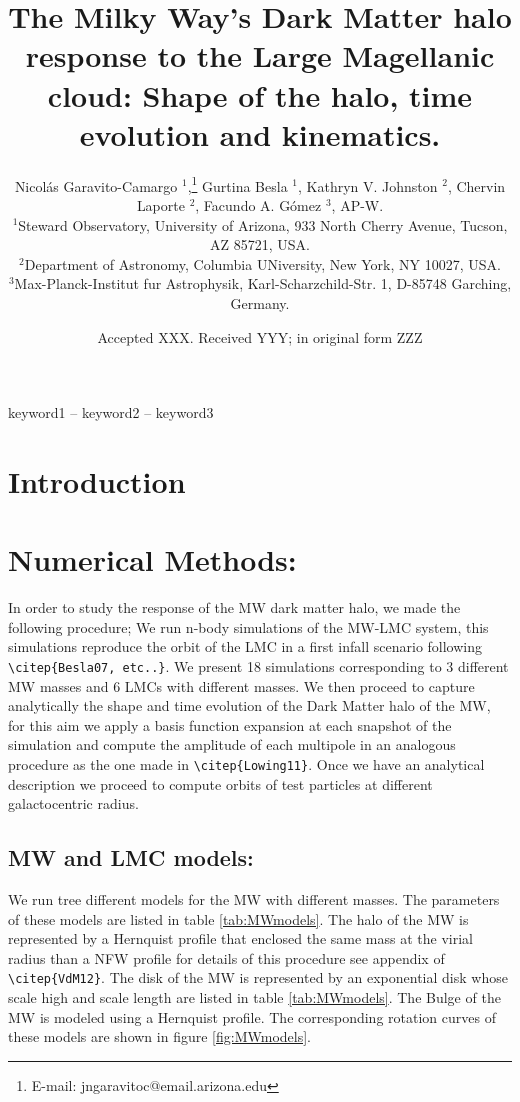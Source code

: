 \documentclass[a4paper,fleqn,usenatbib]{mnras}
\title[The Milky Way Dark Matter halo response to the Large Magellanic
Cloud]{The Milky Way's Dark Matter halo response to the Large Magellanic
cloud: Shape of the halo, time evolution and kinematics.}
\author[N. Garavito-Camargo et al.]{
Nicol\'as Garavito-Camargo $^{1}$,\thanks{E-mail:
jngaravitoc@email.arizona.edu}
Gurtina Besla $^{1}$,
Kathryn V. Johnston $^{2}$,
Chervin Laporte $^{2}$,
Facundo A. G\'omez $^{3}$,
AP-W.
\\
$^{1}$Steward Observatory, University of Arizona, 933 North Cherry
Avenue, Tucson, AZ 85721, USA.\\
$^{2}$Department of Astronomy, Columbia UNiversity, New York, NY
10027, USA.\\
$^{3}$Max-Planck-Institut fur Astrophysik, Karl-Scharzchild-Str. 1,
D-85748 Garching, Germany.
}
\date{Accepted XXX. Received YYY; in original form ZZZ}
\begin{document}
\label{firstpage}
\pagerange{\pageref{firstpage}--\pageref{lastpage}}
\maketitle

\begin{abstract}
\end{abstract}

\begin{keywords}
keyword1 -- keyword2 -- keyword3
\end{keywords}



\section{Introduction}




\cite{Hernquist92}

\section{Numerical Methods:}

In order to study the response of the MW dark matter halo, we made the
following procedure; We run n-body simulations of the MW-LMC
system, this simulations reproduce the orbit of the LMC in a first
infall scenario following \verb+\citep{Besla07, etc..}+. We present 18
simulations corresponding to 3 different MW masses and 6 LMCs with
different masses. We then proceed to capture analytically the shape
and time evolution of the Dark Matter halo of the MW, for this aim we 
apply a basis function expansion at each snapshot of the simulation
and compute the amplitude of each multipole in an analogous
procedure as the one made in \verb+\citep{Lowing11}+. Once we have an
analytical description we proceed to compute orbits of test particles
at different galactocentric radius.


\subsection{MW and LMC models:}

We run tree different models for the MW with different masses. The
parameters of these models are listed in table \ref{tab:MWmodels}. 
The halo of the MW is represented by a Hernquist profile that enclosed
the same mass at the virial radius than a NFW profile for details of
this procedure see appendix of \verb+\citep{VdM12}+. The disk of the
MW is represented by an exponential disk whose scale high and scale
length are listed in table \ref{tab:MWmodels}. The Bulge of the MW is
modeled using a Hernquist profile. The corresponding rotation curves
of these models are shown in figure \ref{fig:MWmodels}.
\end{document}
